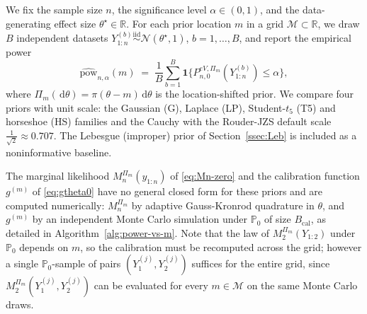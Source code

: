 \documentclass[12pt, a4paper]{report}
\newcommand{\Prob}{\mathbb{P}}
\newcommand{\dd}{\,\mathrm{d}}
\newcommand{\1}{\mathbf{1}}
\begin{document}
We fix the sample size \(n\), the significance level
\(\alpha\in(0,1)\), and the data-generating effect size
\(\theta^\star\in\mathbb{R}\). For each prior location \(m\) in a grid
\(\mathcal M\subset\mathbb{R}\), we draw \(B\) independent datasets
\(Y_{1:n}^{(b)}\stackrel{\mathrm{iid}}{\sim}\mathcal
N(\theta^\star,1)\), \(b=1,\ldots,B\), and report the empirical power
\begin{equation}\label{eq:power-def}
   \widehat{\mathrm{pow}}_{n,\alpha}(m)
   \;=\;\frac{1}{B}\sum_{b=1}^B
       \mathbf 1\!\bigl\{P_{n,0}^{eV,\Pi_m}(Y_{1:n}^{(b)})\leq\alpha\bigr\},
\end{equation}
where \(\Pi_m(\dd\theta)=\pi(\theta-m)\dd\theta\) is the
location-shifted prior. We compare four priors with unit scale: the Gaussian (G), Laplace (LP), Student-\(t_5\) (T5) and horseshoe (HS) families and the Cauchy with the Rouder-JZS default scale $\frac{1}{\sqrt{2}} \approx 0.707$. %
The Lebesgue (improper) prior of
Section~\ref{ssec:Leb} is included as a noninformative baseline.

The marginal likelihood \(M_n^{\Pi_m}(y_{1:n})\) of \eqref{eq:Mn-zero} and the calibration function \(g^{(m)}\) of \eqref{eq:gtheta0} have no general closed form for these priors and are computed numerically: \(M_n^{\Pi_m}\) by adaptive Gauss-Kronrod quadrature \citep{piessens2012quadpack} in \(\theta\), and \(g^{(m)}\) by an independent Monte Carlo simulation under \(\Prob_0\) of size
\(B_{\mathrm{cal}}\), as detailed in Algorithm~\ref{alg:power-vs-m}. Note that the law of \(M_2^{\Pi_m}(Y_{1:2})\) under \(\Prob_0\) depends on \(m\), so the calibration must be recomputed across the grid; however a single \(\Prob_0\)-sample of pairs \((Y_1^{(j)},Y_2^{(j)})\) suffices for the entire grid, since \(M_2^{\Pi_m}(Y_1^{(j)},Y_2^{(j)})\) can be evaluated for every \(m\in\mathcal M\) on the same Monte Carlo draws.
\end{document}
